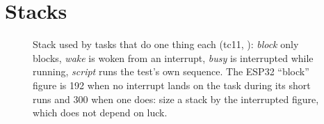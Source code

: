 \section{Stacks}

\begin{figure}[htbp]
\centering
{}
\caption{Stack used by tasks that do one thing each (tc11, \measDate): \emph{block} only
blocks, \emph{wake} is woken from an interrupt, \emph{busy} is interrupted while
running, \emph{script} runs the test's own sequence. The ESP32 ``block'' figure is 192
when no interrupt lands on the task during its short runs and 300 when one does: size a
stack by the interrupted figure, which does not depend on luck.}
\label{fig:stack11}
\end{figure}


